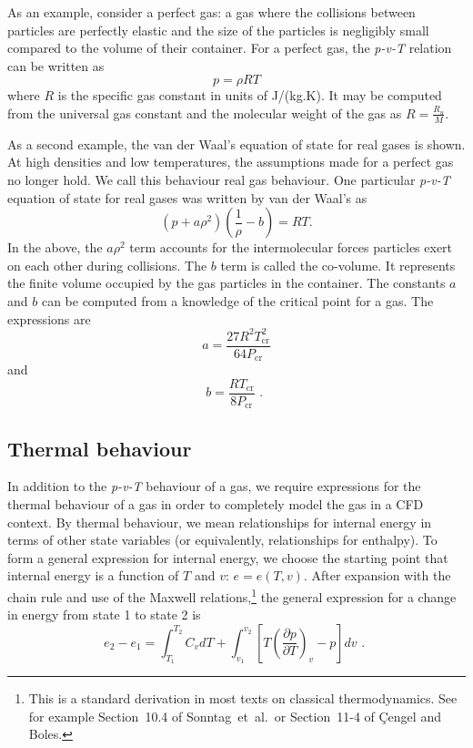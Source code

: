 As an example, consider a perfect gas: a gas where the collisions between particles are perfectly elastic
and the size of the particles is negligibly small compared
to the volume of their container.
For a perfect gas, the \textit{p-v-T} relation can be written as
\begin{equation}
   p = \rho R T
\end{equation}
where $R$ is the specific gas constant in units of J/(kg.K).
It may be computed from the universal gas constant and the molecular weight of the gas as $R = \frac{R_u}{M}$. 

As a second example, the van der Waal's equation of state for real gases is shown.
At high densities and low temperatures, the assumptions made for a perfect gas no longer hold.
We call this behaviour real gas behaviour.
One particular \textit{p-v-T} equation of state for real gases was written by van der Waal's
as
\begin{equation}
  \left ( p + a\rho^2 \right ) \left ( \frac{1}{\rho} - b \right ) = RT.
\end{equation}
In the above, the $a\rho^2$ term accounts for the intermolecular
forces particles exert on each other during collisions.
The $b$ term is called the co-volume.
It represents the finite volume occupied by the gas particles in
the container.
The constants $a$ and $b$ can be computed from a knowledge of
the critical point for a gas.
The expressions are
\begin{equation}
   a = \frac{27 R^2 T^2_{\text{cr}}}{64 P_{\text{cr}}}
\end{equation}
and
\begin{equation}
  b = \frac{R T_{\text{cr}}}{8 P_{\text{cr}}} \text{ . }
\end{equation}


\subsection{Thermal behaviour}
In addition to the \textit{p-v-T} behaviour of a gas, we
require expressions for the thermal behaviour of a gas in 
order to completely model the gas in a CFD context.
By thermal behaviour, we mean relationships for internal
energy in terms of other state variables (or equivalently,
relationships for enthalpy).
To form a general expression for internal energy,
we choose the starting point that internal energy
is a function of $T$ and $v$: $e = e(T,v)$.
After expansion with the chain rule and use of the
Maxwell relations,\footnote{
This is a standard derivation in most texts on classical thermodynamics.
See for example Section~10.4 of Sonntag~et~al.\ or Section~11-4 of
\c{C}engel and Boles.}
the general expression for a change
in energy from state 1 to state 2 is
\begin{equation}
 e_2 - e_1 = \int_{T_1}^{T_2} C_v dT +
             \int_{v_1}^{v_2} \left[ T\left(\frac{\partial p}{\partial T} \right)_v - p \right] dv \text{ . }
\label{eq:int-energy}
\end{equation}

